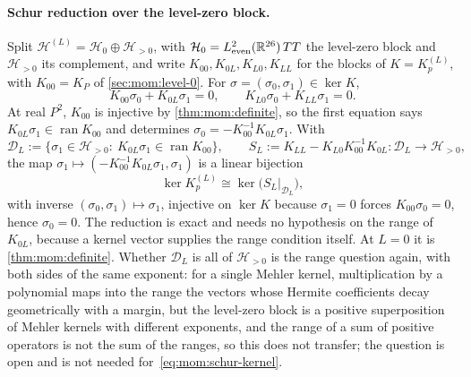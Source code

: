 \paragraph{Schur reduction over the level-zero block.}
Split $\mathcal H^{(L)} = \mathcal H_0 \oplus \mathcal H_{>0}$, with $\mathcal H_0 = L^2_{\rm even}(\mathbb{R}^{26}) \, TT$ the level-zero block and $\mathcal H_{>0}$ its complement, and write $K_{00}, K_{0L}, K_{L0}, K_{LL}$ for the blocks of $K = K^{(L)}_p$, with $K_{00} = K_P$ of \cref{sec:mom:level-0}.
For $\sigma = (\sigma_0, \sigma_1) \in \ker K$,
\begin{equation}
  \label{eq:mom:schur-system}
  K_{00} \sigma_0 + K_{0L} \sigma_1
    = 0,
  \qquad
  K_{L0} \sigma_0 + K_{LL} \sigma_1
    = 0.
\end{equation}
At real $P^2$, $K_{00}$ is injective by \cref{thm:mom:definite}, so the first equation says $K_{0L} \sigma_1 \in \operatorname{ran} K_{00}$ and determines $\sigma_0 = - K_{00}^{-1} K_{0L} \sigma_1$.
With
\begin{equation}
  \label{eq:mom:schur}
  \mathcal D_L
    := \big\{ \sigma_1 \in \mathcal H_{>0} :\ K_{0L} \sigma_1 \in \operatorname{ran} K_{00} \big\},
  \qquad
  S_L
    := K_{LL} - K_{L0} K_{00}^{-1} K_{0L} : \mathcal D_L \to \mathcal H_{>0},
\end{equation}
the map $\sigma_1 \mapsto (- K_{00}^{-1} K_{0L} \sigma_1, \sigma_1)$ is a linear bijection
\begin{equation}
  \label{eq:mom:schur-kernel}
  \ker K^{(L)}_p
    \cong \ker \big( S_L |_{\mathcal D_L} \big),
\end{equation}
with inverse $(\sigma_0, \sigma_1) \mapsto \sigma_1$, injective on $\ker K$ because $\sigma_1 = 0$ forces $K_{00} \sigma_0 = 0$, hence $\sigma_0 = 0$.
The reduction is exact and needs no hypothesis on the range of $K_{0L}$, because a kernel vector supplies the range condition itself.
At $L = 0$ it is \cref{thm:mom:definite}.
Whether $\mathcal D_L$ is all of $\mathcal H_{>0}$ is the range question again, with both sides of the same exponent: for a single Mehler kernel, multiplication by a polynomial maps into the range the vectors whose Hermite coefficients decay geometrically with a margin, but the level-zero block is a positive superposition of Mehler kernels with different exponents, and the range of a sum of positive operators is not the sum of the ranges, so this does not transfer; the question is open and is not needed for~\eqref{eq:mom:schur-kernel}.

